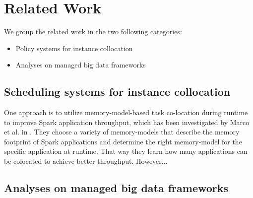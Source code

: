 \section{Related Work}

We group the related work in the two following categories:
\begin{itemize}
\item{Policy systems for instance collocation}
\item{Analyses on managed big data frameworks}
\end{itemize}

\subsection{Scheduling systems for instance collocation}
One approach is to utilize memory-model-based task
co-location during runtime to improve Spark application throughput, which has been
investigated by Marco et al. in \cite{Colocation}. They choose a variety of memory-models
that describe the memory footprint of Spark applications and determine the right memory-model
for the specific application at runtime. That way they learn how many applications can be colocated
to achieve better throughput. However...

\subsection{Analyses on managed big data frameworks}

